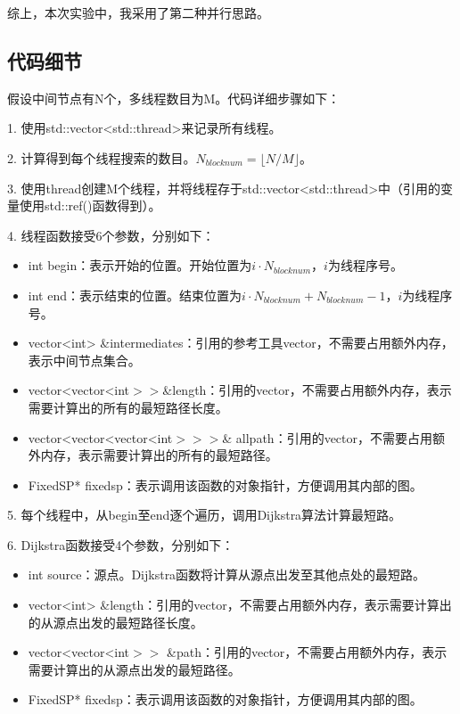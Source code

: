 \documentclass[UTF8]{ctexart}
\begin{document}
综上，本次实验中，我采用了第二种并行思路。

\subsection{代码细节}
假设中间节点有N个，多线程数目为M。代码详细步骤如下：

1. 使用std::vector<std::thread>来记录所有线程。

2. 计算得到每个线程搜索的数目。$N_{blocknum}=\lfloor N/M \rfloor$。

3. 使用thread创建M个线程，并将线程存于std::vector<std::thread>中（引用的变量使用std::ref()函数得到）。

4. 线程函数接受6个参数，分别如下：

\begin{itemize}
    \item int begin：表示开始的位置。开始位置为$i \cdot N_{blocknum}$，$i$为线程序号。
    \item int end：表示结束的位置。结束位置为$i \cdot N_{blocknum}+N_{blocknum}-1$，$i$为线程序号。
    \item vector<int> \&intermediates：引用的参考工具vector，不需要占用额外内存，表示中间节点集合。
    \item vector<vector<int$>>$\&length：引用的vector，不需要占用额外内存，表示需要计算出的所有的最短路径长度。
    \item vector<vector<vector<int$>>>$\& allpath：引用的vector，不需要占用额外内存，表示需要计算出的所有的最短路径。
    \item FixedSP* fixedsp：表示调用该函数的对象指针，方便调用其内部的图。
\end{itemize}

5. 每个线程中，从begin至end逐个遍历，调用Dijkstra算法计算最短路。

6. Dijkstra函数接受4个参数，分别如下：

\begin{itemize}
    \item int source：源点。Dijkstra函数将计算从源点出发至其他点处的最短路。
    \item vector<int> \&length：引用的vector，不需要占用额外内存，表示需要计算出的从源点出发的最短路径长度。
    \item vector<vector<int$>>$ \&path：引用的vector，不需要占用额外内存，表示需要计算出的从源点出发的最短路径。
    \item FixedSP* fixedsp：表示调用该函数的对象指针，方便调用其内部的图。
\end{itemize}
\end{document}
